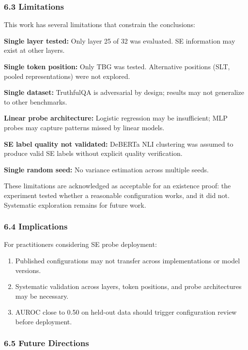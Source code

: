 \subsubsection{6.3 Limitations}

This work has several limitations that constrain the conclusions:

\textbf{Single layer tested:} Only layer 25 of 32 was evaluated. SE information may exist at other layers.

\textbf{Single token position:} Only TBG was tested. Alternative positions (SLT, pooled representations) were not explored.

\textbf{Single dataset:} TruthfulQA is adversarial by design; results may not generalize to other benchmarks.

\textbf{Linear probe architecture:} Logistic regression may be insufficient; MLP probes may capture patterns missed by linear models.

\textbf{SE label quality not validated:} DeBERTa NLI clustering was assumed to produce valid SE labels without explicit quality verification.

\textbf{Single random seed:} No variance estimation across multiple seeds.

These limitations are acknowledged as acceptable for an existence proof: the experiment tested whether a reasonable configuration works, and it did not. Systematic exploration remains for future work.

\subsubsection{6.4 Implications}

For practitioners considering SE probe deployment:

\begin{enumerate}
\item Published configurations may not transfer across implementations or model versions.
\item Systematic validation across layers, token positions, and probe architectures may be necessary.
\item AUROC close to 0.50 on held-out data should trigger configuration review before deployment.
\end{enumerate}

\subsubsection{6.5 Future Directions}

